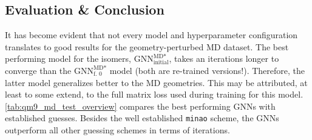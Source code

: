 \subsection{Evaluation \& Conclusion}
\label{sec:qm9_md_isomers_conclusion}
It has become evident that not every model and hyperparameter configuration translates to good results for the geometry-perturbed MD dataset. The best performing model for the isomers, $\text{GNN}^{\text{MD*}}_\text{initial}$, takes an iterations longer to converge than the $\text{GNN}^{\text{MD*}}_\text{f. 0}$ model (both are re-trained versions!). Therefore, the latter model generalizes better to the MD geometries. This may be attributed, at least to some extend, to the full matrix loss used during training for this model. \autoref{tab:qm9_md_test_overview} compares the best performing GNNs with established guesses. Besides the well established \texttt{minao} scheme, the GNNs outperform all other guessing schemes in terms of iterations. 
